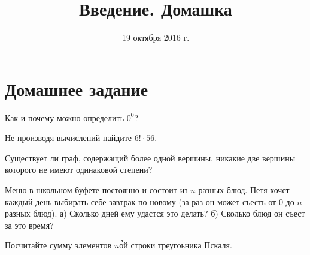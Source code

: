 \documentclass[a4paper, 11pt]{article}
\begin{document}
\renewcommand{\theequation}{\thesection.\arabic{equation}}
\renewcommand{\theex}{\thesection.\arabic{ex}}
\renewcommand{\eqdef}{\triangleq}

\renewcommand{\emptyset}{\varnothing}
\renewcommand{\phi}{\varphi}
\renewcommand{\epsilon}{\varepsilon}

\newcommand{\Cx}{\mathbb{C}}
\newcommand{\Hx}{\mathbb{H}}
\newcommand{\Zm}[1]{\mathbb{Z}_{#1}}
\newcommand{\fA}{~\forall\;}
\newcommand{\Ex}{~\exists\;}
\newcommand{\Exo}{~\exists\,!\;}
\title{Введение. Домашка}
\date{19 октября 2016 г.}
\author{}
\maketitle{}
\section{Домашнее задание}
\begin{problem}
	Как и почему можно определить $0^0$?
\end{problem}
\begin{problem}
	Не производя вычислений найдите $6! \cdot 56$.
\end{problem}
\begin{problem}
	Существует ли граф, содержащий более одной вершины, никакие две вершины которого не имеют
	одинаковой степени?
\end{problem}
\begin{problem}
	Меню в школьном буфете постоянно и состоит из $n$ разных блюд.
	Петя хочет каждый день выбирать себе завтрак по-новому (за раз он может съесть от 0 до $n$ разных блюд).
	а) Сколько дней ему удастся это делать?
	б) Сколько блюд он съест за это время?
\end{problem}
\begin{problem}
	Посчитайте сумму элементов $n$\h ой строки треугоьника Пскаля.
\end{problem}
\end{document}
